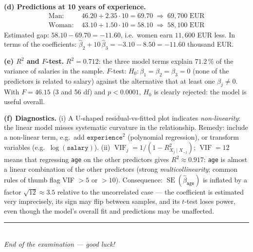 \documentclass[11pt,a4paper]{article}
\begin{document}
\begin{solutionbox}
\medskip
\textbf{(d) Predictions at 10 years of experience.}
\begin{align*}
\text{Man: } & 46.20 + 2.35\cdot 10 = 69.70 \;\Rightarrow\; 69{,}700 \text{ EUR}\\
\text{Woman: } & 43.10 + 1.50\cdot 10 = 58.10 \;\Rightarrow\; 58{,}100 \text{ EUR}
\end{align*}
Estimated gap: $58.10-69.70=-11.60$, i.e.\ women earn $11{,}600$ EUR less. In terms of the
coefficients: $\hat{\beta}_2+10\,\hat{\beta}_3=-3.10-8.50=-11.60$ thousand EUR.

\medskip
\textbf{(e) $R^2$ and $F$-test.}
$R^2=0.712$: the three model terms explain $71.2\,\%$ of the variance of salaries in the sample.
$F$-test: $H_0\!: \beta_1=\beta_2=\beta_3=0$ (none of the predictors is related to salary)
against the alternative that at least one $\beta_j\neq 0$. With $F=46.15$ (3 and 56 df) and
$p<0.0001$, $H_0$ is clearly rejected: the model is useful overall.

\medskip
\textbf{(f) Diagnostics.}
(i) A U-shaped residual-vs-fitted plot indicates \emph{non-linearity}: the linear model misses
systematic curvature in the relationship. Remedy: include a non-linear term, e.g.\ add
$\texttt{experience}^2$ (polynomial regression), or transform variables
(e.g.\ $\log(\texttt{salary})$).
(ii) $\operatorname{VIF}_j = 1/(1-R^2_{X_j\mid X_{-j}})$; $\operatorname{VIF}=12$ means that
regressing \texttt{age} on the other predictors gives $R^2\approx 0.917$: \texttt{age} is
almost a linear combination of the other predictors (strong \emph{multicollinearity}; common
rules of thumb flag VIF $>5$ or $>10$). Consequence: $\operatorname{SE}(\hat{\beta}_{\texttt{age}})$
is inflated by a factor $\sqrt{12}\approx 3.5$ relative to the uncorrelated case --- the
coefficient is estimated very imprecisely, its sign may flip between samples, and its $t$-test
loses power, even though the model's overall fit and predictions may be unaffected.
\end{solutionbox}
\fi

\vspace{6mm}
\begin{center}
\rule{0.35\textwidth}{0.4pt}\\[1mm]
\textit{End of the examination --- good luck!}
\end{center}
\end{document}

